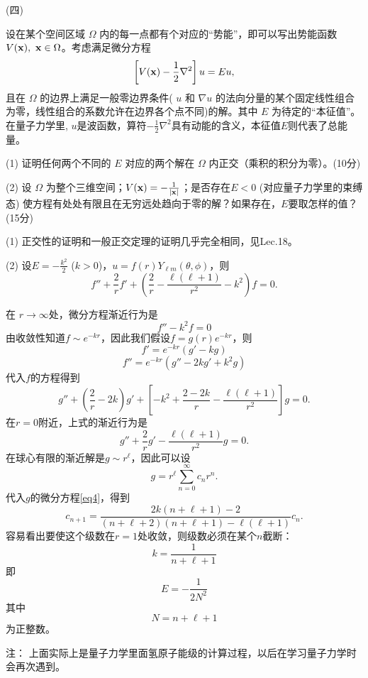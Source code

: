 \documentclass[12pt,CJK]{article}
\begin{document}
\item[(四)]{设在某个空间区域 $\Omega$ 内的每一点都有个对应的“势能”，即可以写出势能函数 $V({\mathbf{x}}),\ {\mathbf{x}}\in \Omega$。考虑满足微分方程
  $$\left[V({\mathbf{x}})-\frac{1}{2}\nabla^2\right] u = E u, $$
  且在 $\Omega$ 的边界上满足一般零边界条件( $u$ 和 $\nabla u$ 的法向分量的某个固定线性组合为零，线性组合的系数允许在边界各个点不同)的解。其中 $E$ 为待定的“本征值”。在量子力学里, $u$是波函数，算符$-\frac{1}{2}\nabla^2$具有动能的含义，本征值$E$则代表了总能量。
  \bitem
\item[(1)]{证明任何两个不同的 $E$ 对应的两个解在 $\Omega$ 内正交（乘积的积分为零）。(10分)}
\item[(2)]{设 $\Omega$ 为整个三维空间；$V({\mathbf{x}}) = -\frac{1}{|{\mathbf{x}}|}$；是否存在$E<0$ (对应量子力学里的束缚态) 使方程有处处有限且在无穷远处趋向于零的解？如果存在，$E$要取怎样的值？ (15分)}  
  \eitem

  {\blue
    (1) 正交性的证明和一般正交定理的证明几乎完全相同，见Lec.18。

    
    (2) 设$E  = -\frac{k^2}{2}$ ($k>0$)，$u = f(r) Y_{\ell m}(\theta,\phi)$，则
    $$ f'' + \frac{2}{r} f' + \left(\frac{2}{r} - \frac{\ell(\ell+1)}{r^2}- k^2\right) f = 0. $$ 

    在 $r\rightarrow \infty$处，微分方程渐近行为是
    $$ f'' - k^2 f = 0 $$
    由收敛性知道$f \sim e^{-kr}$，因此我们假设$f = g(r) e^{-kr}$，则
    $$ f' = e^{-kr}(g' -kg)$$
    $$ f'' = e^{-kr}(g''-2kg'+k^2g)$$
    代入$f$的方程得到
    \begin{equation}
      g''+(\frac{2}{r}-2k)g'+\left[-k^2+\frac{2-2k}{r}-\frac{\ell(\ell+1)}{r^2}\right]g =0. \label{eq4}
    \end{equation}
    在$r=0$附近，上式的渐近行为是
    $$g''+\frac{2}{r}g'-\frac{\ell(\ell+1)}{r^2}g = 0.$$
    在球心有限的渐近解是$g\sim r^\ell$，因此可以设
    $$ g = r^\ell \sum_{n=0}^\infty c_n r^n.$$
    代入$g$的微分方程\eqref{eq4}，得到
    $$ c_{n+1} = \frac{2k(n+\ell+1)-2}{(n+\ell+2)(n+\ell+1)-\ell(\ell+1)}c_n.$$
    容易看出要使这个级数在$r=1$处收敛，则级数必须在某个$n$截断：
    $$ k = \frac{1}{n+\ell+1} $$
    即
    $$E = -\frac{1}{2N^2}$$
    其中 $$ N = n+\ell+1 $$为正整数。

    \skiplines
   注： 上面实际上是量子力学里面氢原子能级的计算过程，以后在学习量子力学时会再次遇到。
  }
}

\eitem  





\ech
\end{document}

